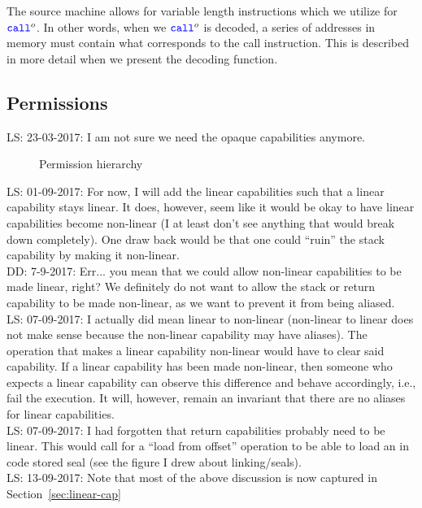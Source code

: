 \documentclass[a3paper]{article}
\newcommand\lau[1]{{\color{purple} \sf \footnotesize {LS: #1}}\\}
\newcommand\dominique[1]{{\color{purple} \sf \footnotesize {DD: #1}}\\}
\newcommand{\sourcecolor}{\color{blue}}
\newcommand{\src}[1]{{\sourcecolor #1}}
\newcommand{\zinstr}[1]{\texttt{#1}}
\newcommand{\scall}[4][]{  
\ifthenelse{\equal{#3#4}{}}
  {\ensuremath{\zinstr{\src{call}}_{#1}^{#2}}}
  {\ensuremath{\zinstr{\src{call}}_{#1}^{#2} \; #3 \; #4}}
}
\newcommand{\plainperm}[1]{\textsc{#1}}
\newcommand{\rwx}{\plainperm{rwx}}
\newcommand{\rx}{\plainperm{rx}}
\newcommand{\rw}{\plainperm{rw}}
\newcommand{\readonly}{\plainperm{r}}
\newcommand{\noperm}{\plainperm{0}}
\begin{document}
The source machine allows for variable length instructions which we utilize for $\scall{o}{}{}$. In other words, when we $\scall{o}{}{}$ is decoded, a series of addresses in memory must contain what corresponds to the call instruction. This is described in more detail when we present the decoding function.

\subsection{Permissions}
\lau{23-03-2017: I am not sure we need the opaque capabilities anymore.} %
\begin{figure}[!h]
  \centering

  \caption{Permission hierarchy}
  \label{fig:perm-hier}
\end{figure}
\lau{01-09-2017: For now, I will add the linear capabilities such that a linear capability stays linear. It does, however, seem like it would be okay to have linear capabilities become non-linear (I at least don't see anything that would break down completely). One draw back would be that one could ``ruin'' the stack capability by making it non-linear.}
\dominique{7-9-2017: Err... you mean that we could allow non-linear capabilities to be made linear, right?  We definitely do not want to allow the stack or return capability to be made non-linear, as we want to prevent it from being aliased.}
\lau{07-09-2017: I actually did mean linear to non-linear (non-linear to linear does not make sense because the non-linear capability may have aliases). The operation that makes a linear capability non-linear would have to clear said capability. If a linear capability has been made non-linear, then someone who expects a linear capability can observe this difference and behave accordingly, i.e., fail the execution. It will, however, remain an invariant that there are no aliases for linear capabilities.}
\lau{07-09-2017: I had forgotten that return capabilities probably need to be linear. This would call for a ``load from offset'' operation to be able to load an in code stored seal (see the figure I drew about linking/seals).}
\lau{13-09-2017: Note that most of the above discussion is now captured in Section~\ref{sec:linear-cap}}
\end{document}
